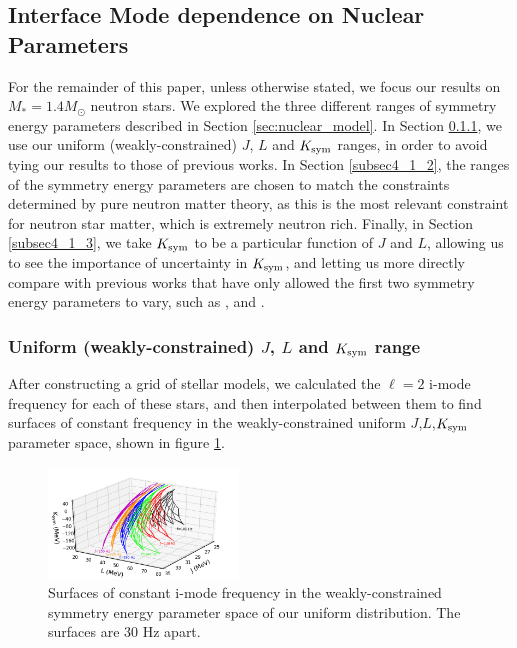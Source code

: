\documentclass[fleqn,usenatbib]{mnras}
\begin{document}
\subsection{Interface Mode dependence on Nuclear Parameters}
\label{sec:EoS_sets}
\hspace{\parindent}For the remainder of this paper, unless otherwise stated, we focus our results on $M_*=1.4M_{\odot}$ neutron stars. We explored the three different ranges of symmetry energy parameters described in Section \ref{sec:nuclear_model}. In Section \ref{subsec4_1_1}, we use our uniform (weakly-constrained) $J$, $L$ and $K_{\rm sym}$ ranges, in order to avoid tying our results to those of previous works. In Section \ref{subsec4_1_2}, the ranges of the symmetry energy parameters are chosen to match the constraints determined by pure neutron matter theory, as this is the most relevant constraint for neutron star matter, which is extremely neutron rich. Finally, in Section \ref{subsec4_1_3}, we take $K_{\rm sym}$ to be a particular function of $J$ and $L$, allowing us to see the importance of uncertainty in $K_{\rm sym}$, and letting us more directly compare with previous works that have only allowed the first two symmetry energy parameters to vary, such as \citet{chen2010density}, \citet{steiner2012connecting} and \citet{tsang2009constraints}.







\subsubsection{Uniform (weakly-constrained) $J$, $L$ and $K_{\rm sym}$ range}\label{subsec4_1_1}
\hspace{\parindent} After constructing a grid of stellar models, we calculated the $\ell = 2$ i-mode frequency for each of these stars, and then interpolated between them to find surfaces of constant frequency in the weakly-constrained uniform $J$,$L$,$K_{\rm sym}$ parameter space, shown in figure \ref{fig:grid_J_L_K}.




\begin{figure}
\centering
\includegraphics[width=0.45\textwidth,angle=0]{grid_J_L_K.png}
\caption{Surfaces of constant i-mode frequency in the weakly-constrained symmetry energy parameter space of our uniform distribution. The surfaces are $30$ Hz apart.}
\label{fig:grid_J_L_K}
\end{figure}
\end{document}
